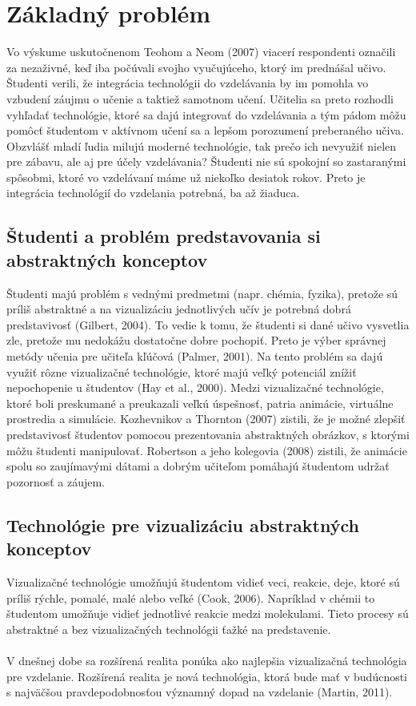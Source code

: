 \documentclass[10pt,oneside,slovak,a4paper]{article}
\begin{document}
\section{Základný problém} \label{zakladnyProblem}
Vo výskume uskutočnenom Teohom a Neom (2007) viacerí respondenti označili za nezaživné, keď iba počúvali svojho vyučujúceho, ktorý im prednášal učivo.
Študenti verili, že integrácia technológii do vzdelávania by im pomohla vo vzbudení záujmu o učenie a taktiež samotnom učení. 
Učitelia sa preto rozhodli vyhľadať technológie, ktoré sa dajú integrovať do vzdelávania a tým pádom môžu pomôcť študentom v aktívnom učení sa a lepšom porozumení preberaného učiva.\cite{Saidin2015}
Obzvlášť mladí ľudia milujú moderné technológie, tak prečo ich nevyužiť nielen pre zábavu, ale aj pre účely vzdelávania? 
Študenti nie sú spokojní so zastaranými spôsobmi, ktoré vo vzdelávaní máme už niekoľko desiatok rokov.
Preto je integrácia technológií do vzdelania potrebná, ba až žiaduca. 
\subsection{Študenti a problém predstavovania si abstraktných konceptov} \label{zakladnyProblem:abstraktneKoncepty}
Študenti majú problém s vednými predmetmi (napr. chémia, fyzika), pretože sú príliš abstraktné a na vizualizáciu jednotlivých učív je potrebná dobrá predstavivosť (Gilbert, 2004).
To vedie k tomu, že študenti si dané učivo vysvetlia zle, pretože mu nedokážu dostatočne dobre pochopiť.
Preto je výber správnej metódy učenia pre učiteľa kľúčová (Palmer, 2001).
Na tento problém sa dajú využiť rôzne vizualizačné technológie, ktoré majú veľký potenciál znížiť nepochopenie u študentov (Hay et al., 2000).
Medzi vizualizačné technológie, ktoré boli preskumané a preukazali veľkú úspešnosť, patria animácie, virtuálne prostredia a simulácie.
Kozhevnikov a Thornton (2007) zistili, že je možné zlepšiť predstavivosť študentov pomocou prezentovania abstraktných obrázkov, s ktorými môžu študenti manipulovať.
Robertson a jeho kolegovia (2008) zistili, že animácie spolu so zaujímavými dátami a dobrým učiteľom pomáhajú študentom udržať pozornosť a záujem.\cite{Saidin2015}
\subsection{Technológie pre vizualizáciu abstraktných konceptov} \label{zakladnyProblem:technologie}
Vizualizačné technológie umožňujú študentom vidieť veci, reakcie, deje, ktoré sú príliš rýchle, pomalé, malé alebo veľké (Cook, 2006).
Napríklad v chémii to študentom umožňuje vidieť jednotlivé reakcie medzi molekulami.
Tieto procesy sú abstraktné a bez vizualizačných technológii ťažké na predstavenie.\cite{Saidin2015}\\
\\V dnešnej dobe sa rozšírená realita ponúka ako najlepšia vizualizačná technológia pre vzdelanie.
Rozšírená realita je nová technológia, ktorá bude mať v budúcnosti s najväčšou pravdepodobnosťou významný dopad na vzdelanie (Martin, 2011).\cite{Saidin2015}
\end{document}
